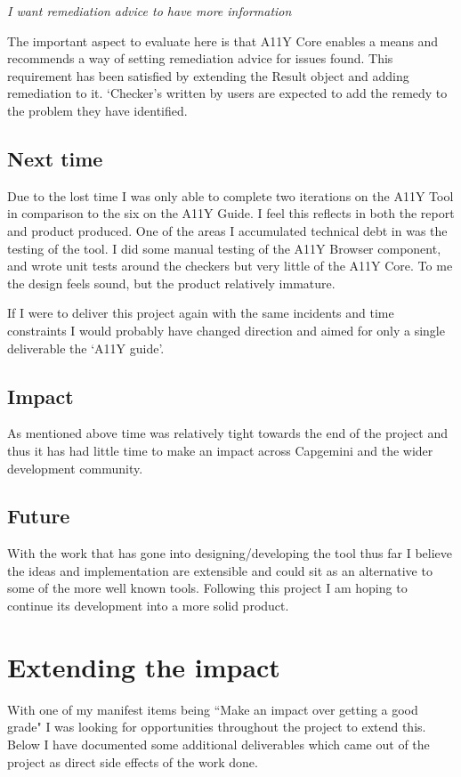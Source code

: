\begin{center}
\textit{I want remediation advice to have more information}
\end{center}
The important aspect to evaluate here is that A11Y Core enables a means and
recommends a way of setting remediation advice for issues found. This
requirement has been satisfied by extending the Result object and adding
remediation to it. `Checker's written by users are expected to add the remedy
to the problem they have identified.

\subsection{Next time}
Due to the lost time I was only able to complete two iterations on the A11Y
Tool in comparison to the six on the A11Y Guide. I feel this reflects in both
the report and product produced. One of the areas I accumulated technical
debt in was the testing of the tool. I did some manual testing of the A11Y
Browser component, and wrote unit tests around the checkers but very
little of the A11Y Core. To me the design feels sound, but the product
relatively immature.

If I were to deliver this project again with the same incidents and time
constraints I would probably have changed direction and aimed for only a
single deliverable the `A11Y guide'.

\subsection{Impact}
As mentioned above time was relatively tight towards the end of the project
and thus it has had little time to make an impact across Capgemini and the
wider development community.

\subsection{Future}
With the work that has gone into designing/developing the tool thus far I
believe the ideas and implementation are extensible and could sit as an
alternative to some of the more well known tools. Following this project I am
hoping to continue its development into a more solid product.


\section{Extending the impact}
With one of my manifest items being ``Make an impact over getting a good
grade" I was looking for opportunities throughout the project to extend this.
Below I have documented some additional deliverables which came out of the
project as direct side effects of the work done.

